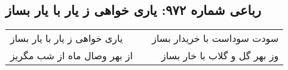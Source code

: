 \begin{center}
\section*{رباعی شماره ۹۷۲: یاری خواهی ز یار با یار بساز}
\label{sec:0972}
\begin{longtable}{l p{0.5cm} r}
یاری خواهی ز یار با یار بساز
&&
سودت سوداست با خریدار بساز
\\
از بهر وصال ماه از شب مگریز
&&
وز بهر گل و گلاب با خار بساز
\\
\end{longtable}
\end{center}
